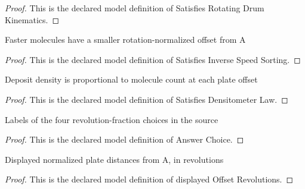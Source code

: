 \begin{proof}
  This is the declared model definition of Satisfies Rotating Drum Kinematics.
\end{proof}
\begin{definition}
  \label{def:physics:phyx-mini-0564:phyxminiproblems-problemphyxmini0564-satisfiesinversespeedsorting}
  Faster molecules have a smaller rotation-normalized offset from A
\end{definition}
\begin{proof}
  This is the declared model definition of Satisfies Inverse Speed Sorting.
\end{proof}
\begin{definition}
  \label{def:physics:phyx-mini-0564:phyxminiproblems-problemphyxmini0564-satisfiesdensitometerlaw}
  Deposit density is proportional to molecule count at each plate offset
\end{definition}
\begin{proof}
  This is the declared model definition of Satisfies Densitometer Law.
\end{proof}
\begin{definition}
  \label{def:physics:phyx-mini-0564:phyxminiproblems-problemphyxmini0564-answerchoice}
  Labels of the four revolution-fraction choices in the source
\end{definition}
\begin{proof}
  This is the declared model definition of Answer Choice.
\end{proof}
\begin{definition}
  \label{def:physics:phyx-mini-0564:phyxminiproblems-problemphyxmini0564-displayedoffsetrevolutions}
  Displayed normalized plate distances from A, in revolutions
\end{definition}
\begin{proof}
  This is the declared model definition of displayed Offset Revolutions.
\end{proof}
